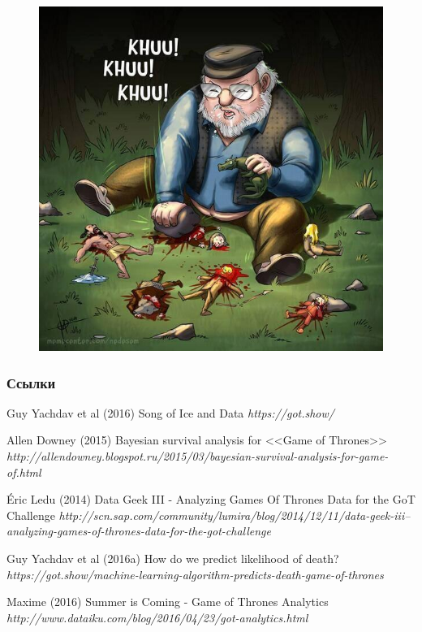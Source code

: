 \documentclass{beamer}
\begin{document}


\begin{frame}
\begin{figure}
\includegraphics[width=0.7\linewidth]{grrm-beetles-}
\end{figure}
\end{frame}


\begin{frame}
\frametitle{Ссылки}
\footnotesize{
\begin{thebibliography}{99} %
 Guy Yachdav et al (2016)
\newblock Song of Ice and Data
\newblock \emph{https://got.show/} 

 Allen Downey (2015)
\newblock Bayesian survival analysis for <<Game of Thrones>>
\newblock \emph{http://allendowney.blogspot.ru/2015/03/bayesian-survival-analysis-for-game-of.html} 

 Éric Ledu (2014)
\newblock Data Geek III - Analyzing Games Of Thrones Data for the GoT Challenge
\newblock \emph{http://scn.sap.com/community/lumira/blog/2014/12/11/data-geek-iii--analyzing-games-of-thrones-data-for-the-got-challenge} 

 Guy Yachdav et al (2016a)
\newblock How do we predict likelihood of death?
\newblock \emph{https://got.show/machine-learning-algorithm-predicts-death-game-of-thrones}

 Maxime (2016)
\newblock Summer is Coming - Game of Thrones Analytics
\newblock \emph{http://www.dataiku.com/blog/2016/04/23/got-analytics.html}

\end{thebibliography}
}
\end{frame}
\end{document}
